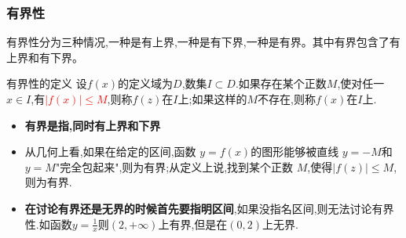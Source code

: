 \documentclass[8pt a4paper, oneside, UTF8]{ctexbook}  %
\begin{document}
\begin{sloppypar}
    \subsubsection{有界性}
    有界性分为三种情况,一种是有上界,一种是有下界,一种是有界。其中有界包含了有上界和有下界。
    \begin{defn}{有界性的定义}{}
        设$f(x)$的定义域为$D$,数集$I \subset D$.如果存在某个正数$M$,使对任一$x \in I$,有\textcolor{red}{$|f(x)| \leqslant M$},则称$f(z)$在$I$上;如果这样的$M$不存在,则称$f(x)$在$I$上.
    \end{defn}
    \begin{itemize}\label{yjxpd1}
        \item \textbf{有界是指,同时有上界和下界}
        \item 从几何上看,如果在给定的区间,函数 $y=f(x)$的图形能够被直线 $y=-M$和 $y=M$"完全包起来",则为有界;从定义上说,找到某个正数 $M$,使得$|f(z)| \leqslant M$,则为有界.
        \item \textbf{在讨论有界还是无界的时候首先要指明区间},如果没指名区间,则无法讨论有界性.如函数$y=\frac{1}{x}$则$(2,+\infty)$上有界,但是在$(0,2)$上无界.
    \end{itemize}

\end{sloppypar}
\end{document}
